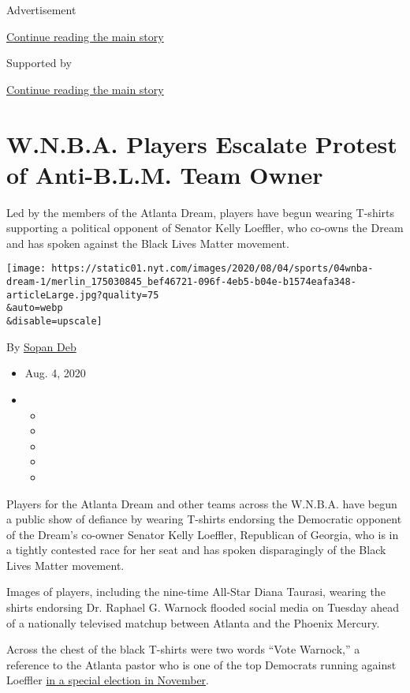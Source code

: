 Advertisement

\protect\hyperlink{after-top}{Continue reading the main story}

Supported by

\protect\hyperlink{after-sponsor}{Continue reading the main story}

\hypertarget{wnba-players-escalate-protest-of-anti-blm-team-owner}{%
\section{W.N.B.A. Players Escalate Protest of Anti-B.L.M. Team
Owner}\label{wnba-players-escalate-protest-of-anti-blm-team-owner}}

Led by the members of the Atlanta Dream, players have begun wearing
T-shirts supporting a political opponent of Senator Kelly Loeffler, who
co-owns the Dream and has spoken against the Black Lives Matter
movement.

\texttt{[image: https://static01.nyt.com/images/2020/08/04/sports/04wnba-dream-1/merlin\_175030845\_bef46721-096f-4eb5-b04e-b1574eafa348-articleLarge.jpg?quality=75\\\&auto=webp\\\&disable=upscale]}

By \href{https://www.nytimes.com/by/sopan-deb}{Sopan Deb}

\begin{itemize}
\item
  Aug. 4, 2020
\item
  \begin{itemize}
  \item
  \item
  \item
  \item
  \item
  \end{itemize}
\end{itemize}

Players for the Atlanta Dream and other teams across the W.N.B.A. have
begun a public show of defiance by wearing T-shirts endorsing the
Democratic opponent of the Dream's co-owner Senator Kelly Loeffler,
Republican of Georgia, who is in a tightly contested race for her seat
and has spoken disparagingly of the Black Lives Matter movement.

Images of players, including the nine-time All-Star Diana Taurasi,
wearing the shirts endorsing Dr. Raphael G. Warnock flooded social media
on Tuesday ahead of a nationally televised matchup between Atlanta and
the Phoenix Mercury.

Across the chest of the black T-shirts were two words ``Vote Warnock,''
a reference to the Atlanta pastor who is one of the top Democrats
running against Loeffler
\href{https://www.nytimes.com/2020/07/09/us/politics/kelly-loeffler-georgia-senate-arizona.html}{in
a special election in November}.

